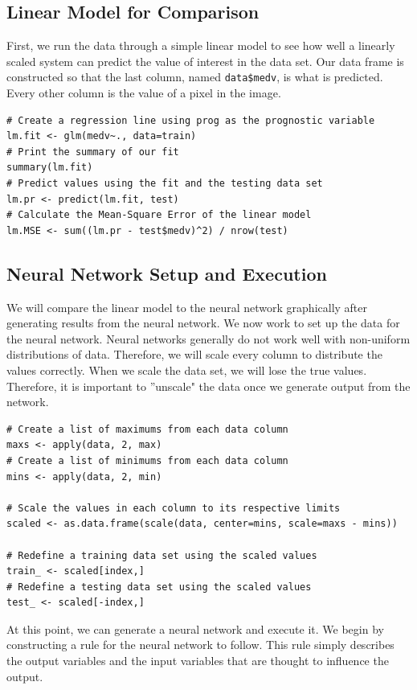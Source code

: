 \subsection{Linear Model for Comparison}

First, we run the data through a simple linear model to see how well a linearly scaled system can predict the value of interest in the data set.
Our data frame is constructed so that the last column, named \verb|data$medv|, is what is predicted. Every other column is the value of a pixel in the image.

\begin{lstlisting}
# Create a regression line using prog as the prognostic variable
lm.fit <- glm(medv~., data=train)
# Print the summary of our fit
summary(lm.fit)
# Predict values using the fit and the testing data set
lm.pr <- predict(lm.fit, test)
# Calculate the Mean-Square Error of the linear model
lm.MSE <- sum((lm.pr - test$medv)^2) / nrow(test)
\end{lstlisting}

\subsection{Neural Network Setup and Execution}

We will compare the linear model to the neural network graphically after generating results from the neural network.
We now work to set up the data for the neural network.
Neural networks generally do not work well with non-uniform distributions of data.
Therefore, we will scale every column to distribute the values correctly.
When we scale the data set, we will lose the true values.
Therefore, it is important to ''unscale" the data once we generate output from the network.

\begin{lstlisting}
# Create a list of maximums from each data column
maxs <- apply(data, 2, max)
# Create a list of minimums from each data column
mins <- apply(data, 2, min)

# Scale the values in each column to its respective limits
scaled <- as.data.frame(scale(data, center=mins, scale=maxs - mins))

# Redefine a training data set using the scaled values
train_ <- scaled[index,]
# Redefine a testing data set using the scaled values
test_ <- scaled[-index,]
\end{lstlisting}

At this point, we can generate a neural network and execute it.
We begin by constructing a rule for the neural network to follow.
This rule simply describes the output variables and the input variables that are thought to influence the output. 

